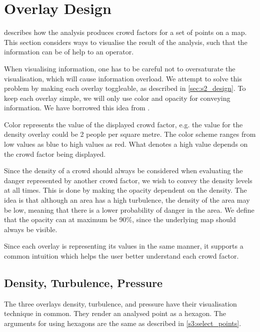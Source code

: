 \section{Overlay Design} \label{sec:s4_overlay}

 describes how the analysis produces crowd factors for a set of points on a map. This section considers ways to visualise the result of the analysis, such that the information can be of help to an operator.

When visualising information, one has to be careful not to oversaturate the visualisation, which will cause information overload. We attempt to solve this problem by making each overlay toggleable, as described in \cref{sec:s2_design}. To keep each overlay simple, we will only use color and opacity for conveying information. We have borrowed this idea from \citet{wirz2012inferring}.

Color represents the value of the displayed crowd factor, e.g. the value for the density overlay could be 2 people per square metre. The color scheme ranges from low values as blue to high values as red. What denotes a high value depends on the crowd factor being displayed.

Since the density of a crowd should always be considered when evaluating the danger represented by another crowd factor, we wish to convey the density levels at all times. This is done by making the opacity dependent on the density. The idea is that although an area has a high turbulence, the density of the area may be low, meaning that there is a lower probability of danger in the area. We define that the opacity can at maximum be 90\%, since the underlying map should always be visible.

Since each overlay is representing its values in the same manner, it supports a common intuition which helps the user better understand each crowd factor.

\subsection{Density, Turbulence, Pressure}
The three overlays density, turbulence, and pressure have their visualisation technique in common. They render an analysed point as a hexagon. The arguments for using hexagons are the same as described in \cref{s3:select_points}.

